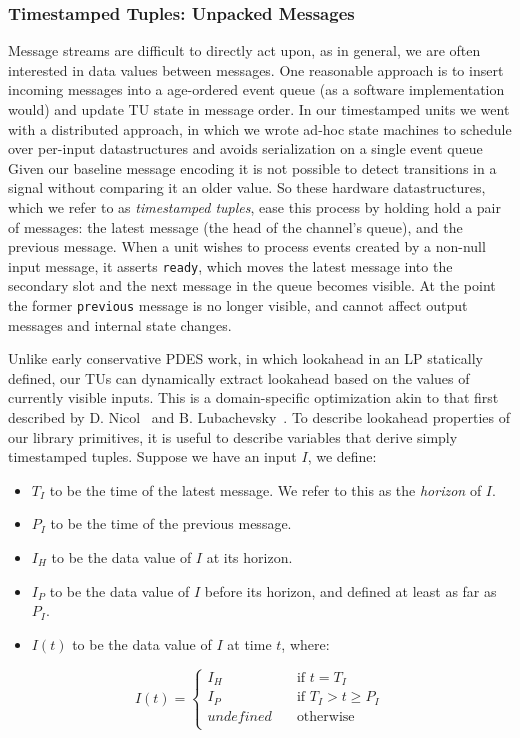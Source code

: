\subsubsection{Timestamped Tuples: Unpacked Messages}
Message streams are difficult to directly act upon, as in general, we are often interested
in data values between messages. One reasonable approach is to insert incoming messages into a
age-ordered event queue (as a software implementation would) and update TU state in message order.
In our timestamped units we went with a distributed approach, in which we wrote ad-hoc state machines to schedule over per-input
datastructures and avoids serialization on a single event queue
Given our baseline message encoding it is not possible to
detect transitions in a signal without comparing it an older value.  So these
hardware datastructures, which we refer to as \emph{timestamped tuples}, ease
this process by holding hold a pair of messages: the latest message (the head
of the channel's queue), and the previous message. When a unit wishes to
process events created by a non-null input message, it asserts \texttt{ready},
which moves the latest message into the secondary slot and the next message in
the queue becomes visible. At the point the former \texttt{previous} message is no longer visible,
and cannot affect output messages and internal state changes.

Unlike early conservative PDES work, in which lookahead in an LP statically
defined, our TUs can dynamically extract lookahead based on the values of
currently visible inputs. This is a domain-specific optimization akin to that
first described by D. Nicol~\cite{ImplicitLookahead} and B.
Lubachevsky~\cite{ImplicitLookahead2}. To describe lookahead properties of our
library primitives, it is useful to describe variables that derive simply
timestamped tuples. Suppose we have an input $I$, we define:

\begin{itemize}
    \item $T_{I}$ to be the time of the latest message. We refer to this as the \emph{horizon} of $I$.
    \item $P_{I}$ to be the time of the previous message.
    \item $I_H$ to be the data value of $I$ at its horizon.
    \item $I_P$ to be the data value of $I$ before its horizon, and defined at least as far as $P_I$.
    \item $I(t)$ to be the data value of $I$ at time $t$, where:
\end{itemize}
\[ I(t) = \begin{cases}
    I_H & \quad \text{if } t = T_{I} \\
    I_P & \quad \text{if }  T_{I} > t \geq P_{I} \\
    undefined & \quad \text{otherwise} \\
\end{cases}
\]


